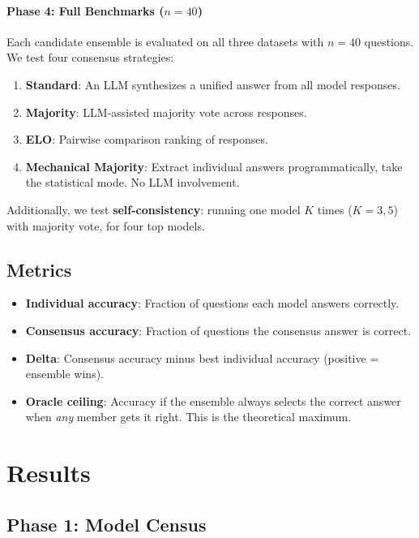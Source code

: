 \documentclass[11pt,a4paper]{article}
\begin{document}
\paragraph{Phase 4: Full Benchmarks ($n=40$)}
Each candidate ensemble is evaluated on all three datasets with $n=40$ questions.
We test four consensus strategies:

\begin{enumerate}
    \item \textbf{Standard}: An LLM synthesizes a unified answer from all model responses.
    \item \textbf{Majority}: LLM-assisted majority vote across responses.
    \item \textbf{ELO}: Pairwise comparison ranking of responses.
    \item \textbf{Mechanical Majority}: Extract individual answers programmatically, take the statistical mode. No LLM involvement.
\end{enumerate}

Additionally, we test \textbf{self-consistency}: running one model $K$ times ($K=3,5$) with majority vote, for four top models.

\subsection{Metrics}

\begin{itemize}
    \item \textbf{Individual accuracy}: Fraction of questions each model answers correctly.
    \item \textbf{Consensus accuracy}: Fraction of questions the consensus answer is correct.
    \item \textbf{Delta}: Consensus accuracy minus best individual accuracy (positive = ensemble wins).
    \item \textbf{Oracle ceiling}: Accuracy if the ensemble always selects the correct answer when \emph{any} member gets it right. This is the theoretical maximum.
\end{itemize}

\section{Results}
\label{sec:results}

\subsection{Phase 1: Model Census}
\end{document}
